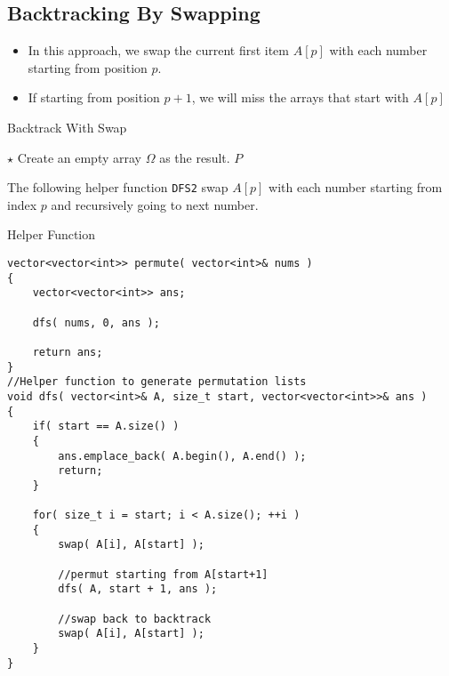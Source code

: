 \subsection{Backtracking By Swapping}
\begin{itemize}
\item In this approach, we swap the current first item $A[p]$ with each number starting from position $p$. 
\item If starting from position $p+1$, we will miss the arrays that start with $A[p]$
\end{itemize}


\begin{algorithm}[H]
\caption{Backtrack With Swap}
\begin{algorithmic}[1]
\State $\star$ Create an empty array $\Omega$ as the result.
\State {} 
\State \Return $P$
\EndProcedure
\end{algorithmic}
\end{algorithm}


The following helper function \texttt{DFS2} swap $A[p]$ with each number starting from index $p$ and recursively going to next number.

\begin{algorithm}[H]
\caption{Helper Function}
\end{algorithm}

\setcounter{lstlisting}{0}
\begin{lstlisting}[style=customc, caption={Backtrack With Swap}]
vector<vector<int>> permute( vector<int>& nums )
{
    vector<vector<int>> ans;

    dfs( nums, 0, ans );

    return ans;
}
//Helper function to generate permutation lists
void dfs( vector<int>& A, size_t start, vector<vector<int>>& ans )
{
    if( start == A.size() )
    {
        ans.emplace_back( A.begin(), A.end() );
        return;
    }

    for( size_t i = start; i < A.size(); ++i )
    {
        swap( A[i], A[start] );

        //permut starting from A[start+1]
        dfs( A, start + 1, ans );

        //swap back to backtrack
        swap( A[i], A[start] );
    }
}
\end{lstlisting}
